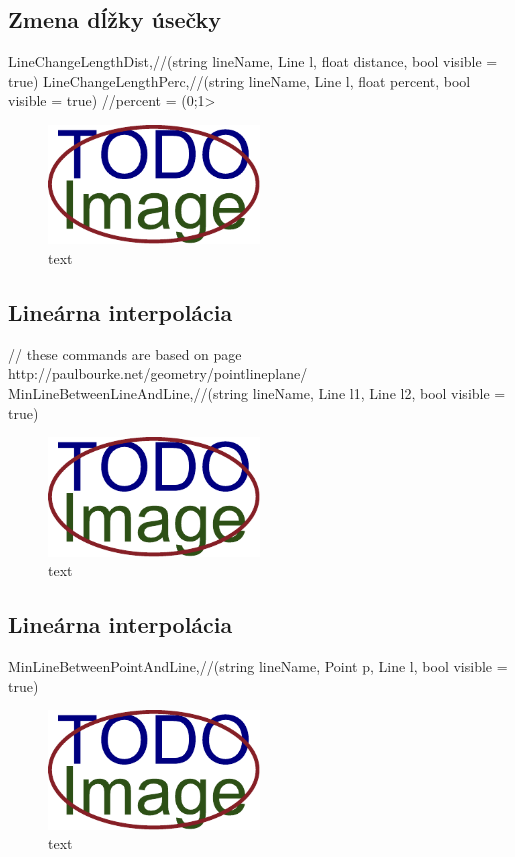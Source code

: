 \subsection{Zmena dĺžky úsečky}
		LineChangeLengthDist,//(string lineName, Line l, float distance, bool visible = true)
		LineChangeLengthPerc,//(string lineName, Line l, float percent, bool visible = true) //percent = (0;1>

\begin{figure}[H]
	\centering
	\includegraphics[width=0.5\textwidth]{obrazky-figures/placeholder.pdf}
	\caption{text}
	\label{fig:1}
\end{figure}


\subsection{Lineárna interpolácia}

		// these commands are based on page http://paulbourke.net/geometry/pointlineplane/
		MinLineBetweenLineAndLine,//(string lineName, Line l1, Line l2, bool visible = true)

\begin{figure}[H]
	\centering
	\includegraphics[width=0.5\textwidth]{obrazky-figures/placeholder.pdf}
	\caption{text}
	\label{fig:1}
\end{figure}

\subsection{Lineárna interpolácia}
		MinLineBetweenPointAndLine,//(string lineName, Point p, Line l, bool visible = true)

\begin{figure}[H]
	\centering
	\includegraphics[width=0.5\textwidth]{obrazky-figures/placeholder.pdf}
	\caption{text}
	\label{fig:1}
\end{figure}

